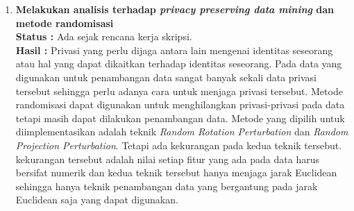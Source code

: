 \documentclass[a4paper,twoside]{article}
\begin{document}
\begin{enumerate}
		\item \textbf{Melakukan analisis terhadap \textit{privacy preserving data mining} dan metode randomisasi}\\
		{\bf Status :} Ada sejak rencana kerja skripsi.\\
		{\bf Hasil :} Privasi yang perlu dijaga antara lain mengenai identitas seseorang atau hal yang dapat dikaitkan terhadap identitas seseorang. Pada data yang digunakan untuk penambangan data sangat banyak sekali data privasi tersebut sehingga perlu adanya cara untuk menjaga privasi tersebut. Metode randomisasi dapat digunakan untuk menghilangkan privasi-privasi pada data tetapi masih dapat dilakukan penambangan data. Metode yang dipilih untuk diimplementasikan adalah teknik \textit{Random Rotation Perturbation} dan  \textit{Random Projection Perturbation}. Tetapi ada kekurangan pada kedua teknik tersebut. kekurangan tersebut adalah nilai setiap fitur yang ada pada data harus bersifat numerik dan kedua teknik tersebut hanya menjaga jarak Euclidean sehingga hanya teknik penambangan data yang bergantung pada jarak Euclidean saja yang dapat digunakan.


\end{enumerate}
\end{document}
